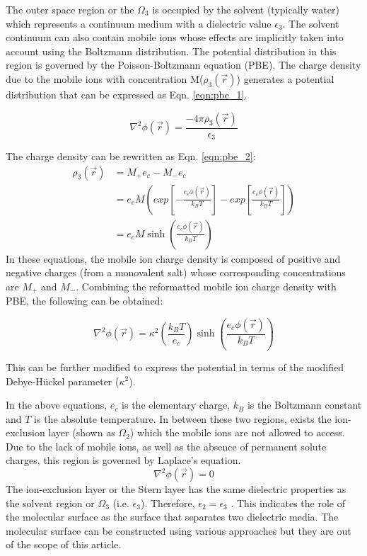 \documentclass[9pt,tutorial]{livecoms}
\begin{document}
The outer space region or the $ \Omega_3 $ is occupied by the solvent (typically water) which represents a continuum medium with a dielectric value $ \epsilon_3 $. The solvent continuum can also contain mobile ions whose effects are implicitly taken into account using the Boltzmann distribution. The potential distribution in this region is governed by the Poisson-Boltzmann equation (PBE). The charge density due to the mobile ions with concentration M($ \rho_3(\Vec{r}) $) generates a potential distribution that can be expressed as Eqn. \ref{eqn:pbe_1}.

\begin{equation}\label{eqn:pbe_1}
\nabla^2\phi(\Vec{r}) = \frac{-4\pi\rho_3(\Vec{r})}{\epsilon_3} 
\end{equation}

The charge density can be rewritten as Eqn. \ref{eqn:pbe_2}:
\begin{align}\label{eqn:pbe_2}
\rho_3(\Vec{r}) &= M_+ e_c - M_- e_c \nonumber \\
&= e_c M \left(exp\left[ - \frac{e_c\phi(\Vec{r})}{k_BT}\right] - exp\left[  \frac{e_c\phi(\Vec{r})}{k_BT}\right]\right) \nonumber \\
&= e_c M \sinh\left({\frac{e_c\phi(\Vec{r})}{k_BT}}\right)
\end{align}
In these equations, the mobile ion charge density is composed of positive and negative charges (from a monovalent salt) whose corresponding concentrations are $ M_+ $ and $ M_- $. Combining the reformatted mobile ion charge density with PBE, the following can be obtained:

\begin{equation}\label{eqn:pbe_3}
\nabla^2\phi(\Vec{r}) = \kappa^2 \left (\frac{k_BT}{e_c} \right) \sinh\left({\frac{e_c\phi(\Vec{r})}{k_BT}} \right)
\end{equation}

This can be further modified to express the potential in terms of the modified Debye-Hückel parameter ($\kappa^2$).

In the above equations, $ e_c $ is the elementary charge, $ k_B $ is the Boltzmann constant and $ T $ is the absolute temperature.
In between these two regions,  exists the ion-exclusion layer (shown as $ \Omega_2 $) which the mobile ions are not allowed to access. Due to the lack of mobile ions, as well as the absence of permanent solute charges, this region is governed by Laplace’s equation.
\begin{equation}
\nabla^2\phi(\Vec{r}) = 0
\end{equation}
The ion-exclusion layer or the Stern layer has the same dielectric properties as the solvent region or $ \Omega_3 $ (i.e. $ \epsilon_3 $). Therefore, $ \epsilon_2=\epsilon_3 $ . This indicates the role of the molecular surface as the surface that separates two dielectric media. The molecular surface can be constructed using various approaches but they are out of the scope of this article\cite{rocchia2002rapid,chakravorty2019grid,decherchi2013between}. 
\end{document}
